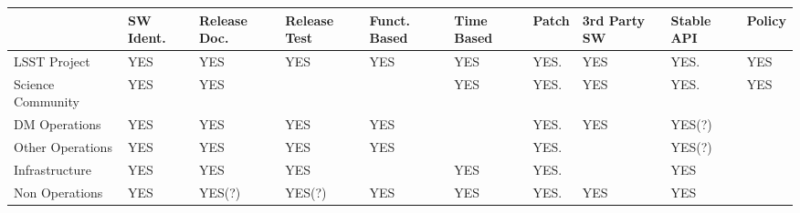 \setlength\LTleft{-0.4in}
\setlength\LTright{-0.5in}
\begin{longtable}{p{2.4cm}p{1.2cm}p{1.4cm}p{1.4cm}p{1.3cm}p{1.3cm}p{1.3cm}p{1.7cm}p{1.3cm}p{1.3cm}}\hline
& 
SW Ident.            & Release Doc.                  & Release Test & Funct. Based           & Time Based & Patch & 3rd Party SW  & Stable API  & Policy \\ \hline
LSST Project &
YES                     & YES                                & YES               &  YES                        &  YES            & YES.   & YES               &  YES.          & YES   \\ \hline
Science Community &
YES                     & YES                                &                       &                                 &  YES            & YES.   & YES               &  YES.          & YES   \\ \hline
DM Operations &
YES                     & YES                                & YES               & YES                         &                     & YES.   & YES               &  YES(?)      &            \\ \hline
Other Operations &
YES                     & YES                                & YES               & YES                         &                     & YES.   &                       &  YES(?)      &            \\ \hline
Infrastructure &
YES                     & YES                                & YES               &                                 &  YES            & YES.   &                       &  YES           &            \\ \hline
Non Operations &
YES                     & YES(?)                            & YES(?)          & YES                         &  YES            & YES.   & YES               &  YES          &            \\ \hline
\hline
\end{longtable}
\setlength\LTleft{0in}
\setlength\LTright{0in}


